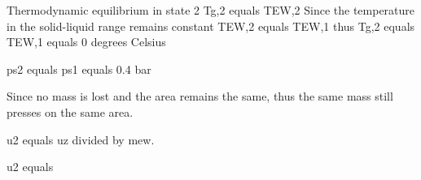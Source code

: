 Thermodynamic equilibrium in state 2  
Tg,2 equals TEW,2  
Since the temperature in the solid-liquid range remains constant  
TEW,2 equals TEW,1 thus Tg,2 equals TEW,1 equals 0 degrees Celsius  

ps2 equals ps1 equals 0.4 bar  

Since no mass is lost and the area remains the same, thus the same mass still presses on the same area.

u2 equals uz divided by mew.

u2 equals
